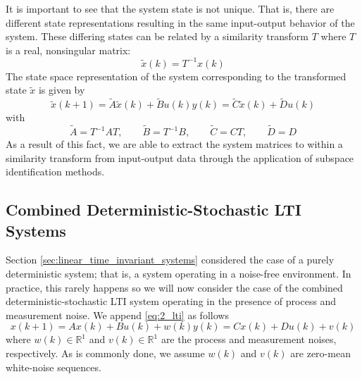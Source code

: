 It is important to see that the system state is not unique. That is, there are different state representations resulting in the same input-output behavior of the system. These differing states can be related by a similarity transform $T$ where $T$ is a real, nonsingular matrix:
\begin{equation*}
\tilde{x}(k) = T^{-1}x(k)
\end{equation*}
The state space representation of the system corresponding to the transformed state $\tilde{x}$ is given by
\begin{subequations}
\begin{equation*}\tilde{x}(k+1) = \tilde{A}\tilde{x}(k) + \tilde{B}u(k)\end{equation*}
\begin{equation*}y(k) = \tilde{C}\tilde{x}(k) + \tilde{D}u(k)\end{equation*}
\end{subequations}
with
\begin{equation*}
\tilde{A} = T^{-1}AT, \qquad
\tilde{B} = T^{-1}B, \qquad
\tilde{C} = CT, \qquad
\tilde{D} = D
\end{equation*}
As a result of this fact, we are able to extract the system matrices to within a similarity transform from input-output data through the application of subspace identification methods.

\subsection{Combined Deterministic-Stochastic LTI Systems}
Section \ref{sec:linear_time_invariant_systems} considered the case of a purely deterministic system; that is, a system operating in a noise-free environment. In practice, this rarely happens so we will now consider the case of the combined deterministic-stochastic LTI system operating in the presence of process and measurement noise. We append \ref{eq:2_lti} as follows
\begin{subequations}\label{eq:2_lti_noise}
\begin{equation}x(k+1) = Ax(k) + Bu(k) + w(k)\end{equation}
\begin{equation}y(k) = Cx(k) + Du(k) + v(k)\end{equation}
\end{subequations}
where $w(k)\in\mathbb{R}^1$ and $v(k)\in\mathbb{R}^1$ are the process and measurement noises, respectively. As is commonly done, we assume $w(k)$ and $v(k)$ are zero-mean white-noise sequences. 

